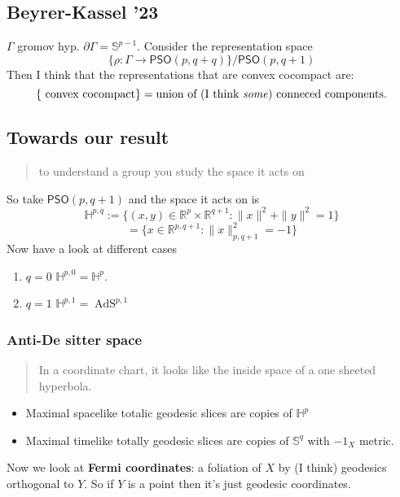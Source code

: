 \subsection{Beyrer-Kassel '23}

\(\Gamma\) gromov hyp. \(\partial  \Gamma=\mathbb{S}^{p-1}\). Consider the representation space
\[\{\rho:\Gamma\to \mathsf{PSO}(p,q+q)\}\Big/\mathsf{PSO}(p,q+1)\]
Then I think that the representations that are convex cocompact are:
\[\{\text{ convex cocompact} \}=\text{union of (I think \textit{some}) conneced components.} \]
\subsection{Towards our result}

\begin{quotation}
	to understand a group you study the space it acts on
\end{quotation}

So take \(\mathsf{PSO}(p,q+1)\) and the space it acts on is
\[\mathbb{H}^{p,q}:=\{(x,y) \in \mathbb{R}^p \times \mathbb{R}^{q+1}: \|x\|^2+\|y\|^2=1\}\]
\[=\{x \in \mathbb{R}^{p,q+1}: \|x\|^2_{p,q+1}=-1\}\]
Now have a look at different cases
\begin{enumerate}
\item \(q=0\) \(\mathbb{H}^{p,0}=\mathbb{H}^{p}\).
\item \(q=1\) \(\mathbb{H}^{p,1}=\operatorname{AdS}^{p,1}\)
\end{enumerate}

\subsubsection{Anti-De sitter space}

\begin{quotation}
	In a coordinate chart, it looks like the inside space of a one sheeted hyperbola.
\end{quotation}

\begin{itemize}
\item Maximal spacelike totalic geodesic slices are copies of \(\mathbb{H}^{p}\) 
\item Maximal timelike totally geodesic slices are copies of \(\mathbb{S}^q\) with \(-1_X\) metric.
\end{itemize}

Now we look at \textbf{Fermi coordinates}: a foliation of \(X\) by (I think) geodesics orthogonal to \(Y\). So if  \(Y\) is a point then it's just geodesic coordinates.

